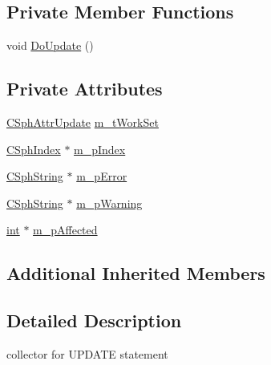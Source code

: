 \subsection*{Private Member Functions}
\begin{DoxyCompactItemize}
\item 
void \hyperlink{classCSphUpdateQueue_a85c32db9cade376d1e1555baf3793df2}{Do\-Update} ()
\end{DoxyCompactItemize}
\subsection*{Private Attributes}
\begin{DoxyCompactItemize}
\item 
\hyperlink{structCSphAttrUpdate}{C\-Sph\-Attr\-Update} \hyperlink{classCSphUpdateQueue_ad48213763b192a49424007a383c7526e}{m\-\_\-t\-Work\-Set}
\item 
\hyperlink{classCSphIndex}{C\-Sph\-Index} $\ast$ \hyperlink{classCSphUpdateQueue_ac98ce17207fd7704a4c01cb09c9e6d66}{m\-\_\-p\-Index}
\item 
\hyperlink{structCSphString}{C\-Sph\-String} $\ast$ \hyperlink{classCSphUpdateQueue_a43045520035db6b6d5ea87d9cdae80be}{m\-\_\-p\-Error}
\item 
\hyperlink{structCSphString}{C\-Sph\-String} $\ast$ \hyperlink{classCSphUpdateQueue_a1e21d7d648a803dee927cb16cda6176d}{m\-\_\-p\-Warning}
\item 
\hyperlink{sphinxexpr_8cpp_a4a26e8f9cb8b736e0c4cbf4d16de985e}{int} $\ast$ \hyperlink{classCSphUpdateQueue_a04c1dc9fa792a688fc3fbb854336d772}{m\-\_\-p\-Affected}
\end{DoxyCompactItemize}
\subsection*{Additional Inherited Members}


\subsection{Detailed Description}
collector for U\-P\-D\-A\-T\-E statement 

